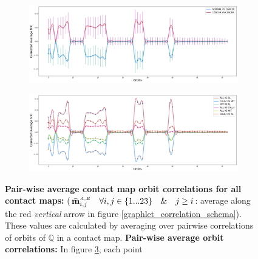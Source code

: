 \documentclass[a4,center,fleqn]{NAR}
\begin{document}
\begin{figure}
    \centering

    \begin{subfigure}[b]{\textwidth}
        \includegraphics[width=\textwidth]{figures/orbits_correlations_cancer_vs_normal.png}
    \caption{}
    \label{fig:orbits_correlations_normal_vs_cancer}
    \end{subfigure}
    \begin{subfigure}[b]{\textwidth}
    \includegraphics[width=\textwidth]{figures/orbits_correlations_all.png}
    \caption{}
    \label{fig:orbits_correlations_all}
    \end{subfigure}
    \caption{
        \textbf{Pair-wise 
        average contact map orbit correlations
        for all contact maps:}
        ($\bar{\mathbf{m}}^{\scriptscriptstyle \scriptscriptstyle A,B}_{i,j} 
        \quad \forall i,j \in \{1 ... 23\} \quad \& \quad j \ge i$:
        average along the 
        red \textit{vertical} arrow in figure 
        \ref{graphlet_correlation_schema}).
        These values are calculated by averaging over 
        pairwise correlations of orbits of
        $\mathbb{Q}$ in a contact map.
        \textbf{Pair-wise average orbit correlations:}
        In figure \ref{fig:orbits_correlations_all}, each point
}
\end{figure}
\end{document}
